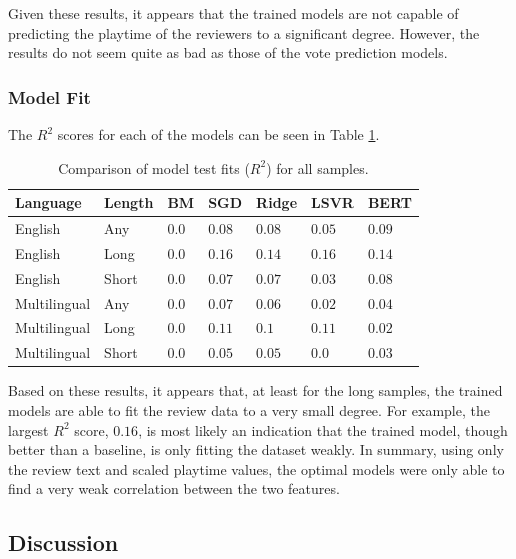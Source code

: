 Given these results, it appears that the trained models are not capable of predicting the playtime of the reviewers to a significant degree. However, the results do not seem quite as bad as those of the vote prediction models.

\subsubsection{Model Fit}

The $R^2$ scores for each of the models can be seen in Table \ref{tab:Res_RF_PT_CompFit}.

\begin{table}[ht]
    \centering
    \begin{tabular}{l l | l l l l l}
        \toprule
        \textbf{Language} & \textbf{Length} & \textbf{BM} & \textbf{SGD} & \textbf{Ridge} & \textbf{LSVR} & \textbf{BERT}\\\midrule
        English&Any&$0.0$&$0.08$&$0.08$&$0.05$&$\mathbf{0.09}$\\
        English&Long&$0.0$&$\mathbf{0.16}$&$0.14$&$0.16$&$0.14$\\
        English&Short&$0.0$&$0.07$&$0.07$&$0.03$&$\mathbf{0.08}$\\\midrule
        Multilingual&Any&$0.0$&$\mathbf{0.07}$&$0.06$&$0.02$&$0.04$\\
        Multilingual&Long&$0.0$&$0.11$&$0.1$&$\mathbf{0.11}$&$0.02$\\
        Multilingual&Short&$0.0$&$\mathbf{0.05}$&$0.05$&$0.0$&$0.03$\\
        \bottomrule
    \end{tabular}
    \caption{Comparison of model test fits ($R^2$) for all samples.}
    \label{tab:Res_RF_PT_CompFit}
\end{table}

Based on these results, it appears that, at least for the long samples, the trained models are able to fit the review data to a very small degree. For example, the largest $R^2$ score, $0.16$, is most likely an indication that the trained model, though better than a baseline, is only fitting the dataset weakly. In summary, using only the review text and scaled playtime values, the optimal models were only able to find a very weak correlation between the two features.

\subsection{Discussion}

